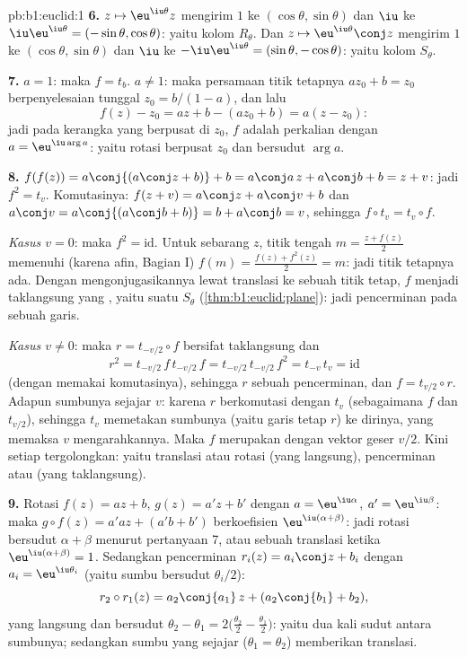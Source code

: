\begin{solution}{pb:b1:euclid:1}
\textbf{6.} $z \mapsto \eu^{\iu\theta}z$ mengirim $1$ ke
$(\cos\theta, \sin\theta)$ dan $\iu$ ke
$\iu\eu^{\iu\theta} = (-\sin\theta, \cos\theta)$: yaitu kolom
$R_\theta$. Dan $z \mapsto \eu^{\iu\theta}\conj z$ mengirim $1$ ke
$(\cos\theta, \sin\theta)$ dan $\iu$ ke $-\iu\eu^{\iu\theta} =
(\sin\theta, -\cos\theta)$: yaitu kolom $S_\theta$.

\textbf{7.} $a = 1$: maka $f = t_b$. $a \neq 1$: maka persamaan
titik tetapnya $az_0 + b = z_0$ berpenyelesaian tunggal $z_0 = b/(1 -
a)$, dan lalu
\[
f(z) - z_0 = az + b - (az_0 + b) = a(z - z_0):
\]
jadi pada kerangka yang berpusat di $z_0$, $f$ adalah perkalian dengan $a
= \eu^{\iu\arg a}$: yaitu rotasi berpusat $z_0$ dan bersudut
$\arg a$.

\textbf{8.} $f(f(z)) = a\conj{(a\conj z + b)} + b = a\conj a\,z
+ a\conj b + b = z + v$: jadi $f^2 = t_v$. Komutasinya: $f(z + v) =
a\conj z + a\conj v + b$ dan $a\conj v = a\conj{(a\conj b + b)}
= b + a\conj b = v$, sehingga $f\circ t_v = t_v\circ f$.

\emph{Kasus $v = 0$}: maka $f^2 = \mathrm{id}$. Untuk sebarang $z$,
titik tengah $m = \frac{z + f(z)}2$ memenuhi (karena 
afin, Bagian I) $f(m) = \frac{f(z) + f^2(z)}{2} = m$: jadi titik
tetapnya ada. Dengan mengonjugasikannya lewat translasi ke sebuah titik tetap,
$f$ menjadi  taklangsung yang , yaitu suatu $S_\theta$
(\cref{thm:b1:euclid:plane}): jadi pencerminan pada sebuah garis.

\emph{Kasus $v \neq 0$}: maka $r = t_{-v/2}\circ f$ bersifat taklangsung dan
\[
r^2 = t_{-v/2}\,f\,t_{-v/2}\,f = t_{-v/2}\,t_{-v/2}\,f^2
= t_{-v}\,t_v = \mathrm{id}
\]
(dengan memakai komutasinya), sehingga $r$ sebuah pencerminan, dan $f =
t_{v/2}\circ r$. Adapun sumbunya sejajar $v$: karena $r$ berkomutasi dengan
$t_v$ (sebagaimana $f$ dan $t_{v/2}$), sehingga $t_v$ memetakan sumbunya (yaitu
garis tetap $r$) ke dirinya, yang memaksa $v$ mengarahkannya. Maka
$f$ merupakan  dengan vektor geser $v/2$. Kini setiap
 tergolongkan: yaitu translasi atau rotasi (yang langsung),
pencerminan atau  (yang taklangsung).

\textbf{9.} Rotasi $f(z) = az + b$, $g(z) = a'z + b'$ dengan
$a = \eu^{\iu\alpha}$, $a' = \eu^{\iu\beta}$: maka $g\circ f(z) =
a'az + (a'b + b')$ berkoefisien 
$\eu^{\iu(\alpha+\beta)}$: jadi rotasi bersudut $\alpha + \beta$
menurut pertanyaan 7, atau sebuah translasi ketika $\eu^{\iu(\alpha+\beta)} =
1$. Sedangkan pencerminan $r_i(z) = a_i\conj z + b_i$ dengan $a_i =
\eu^{\iu\theta_i}$ (yaitu sumbu bersudut $\theta_i/2$):
\[
r_2\circ r_1(z) = a_2\conj{a_1}\,z + (a_2\conj{b_1} + b_2),
\]
yang langsung dan bersudut $\theta_2 - \theta_1 = 2\bigl(\tfrac{\theta_2}2
- \tfrac{\theta_1}2\bigr)$: yaitu dua kali sudut antara sumbunya;
sedangkan sumbu yang sejajar ($\theta_1 = \theta_2$) memberikan translasi.


\end{solution}
